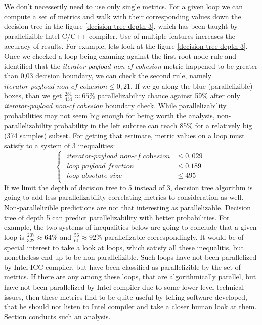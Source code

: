 \null\qquad We don't necesserily need to use only single metrics. For a given loop we can compute a set of metrics and walk with their corresponding values down the decision tree in the figure \ref{decision-tree-depth-3}, which has been taught by parallelizible Intel C/C++ compiler. Use of multiple features increases the accuracy of results. For example, lets look at the figure \ref{decision-tree-depth-3}. Once we checked a loop being examing against the first root node rule and identified that the \textit{iterator-payload non-cf cohesion} metric happened to be greater than 0,03 decision boundary, we can check the second rule, namely $\textit{iterator-payload non-cf cohesion}\leq 0,21$. If we go along the blue (parallelizible) boxes, than we get $\frac{281}{434}\approx 65\%$ parallelizability chance against 59\% after only \textit{iterator-payload non-cf cohesion} boundary check. While parallelizability probabilities may not seem big enough for being worth the analysis, non-parallelizability probability in the left subtree can reach 85\% for a relatively big (374 samples) subset. For getting that estimate, metric values on a loop must satisfy to a system of 3 inequalities:\newline
\begin{equation*}
\begin{cases}
\begin{aligned}
\textit{iterator-payload non-cf cohesion}            &\le 0,029 \\[1ex]
\textit{loop payload fraction} &\le 0.189 \\[1ex]
\textit{loop absolute size} &\leq 495
\end{aligned}
\end{cases}
\end{equation*}\newline
\null\qquad If we limit the depth of decision tree to 5 instead of 3, decision tree algorithm is going to add less parallelizability correlating metrics to consideration as well. Non-parallelizible predictions are not that interesting as parallelizable. Decision tree of depth 5 can predict parallelizability with better probabilities. For example, the two systems of inequalities below are going to conclude that a given loop is $\frac{207}{322}\approx 64\%$ and $\frac{56}{61}\approx 92\%$ parallelizable correspondingly.\newline
\null\qquad It would be of special interest to take a look at loops, which satisfy all these inequalitis, but nonetheless end up to be non-parallelizible. Such loops have not been parallelized by Intel ICC compiler, but have been classified as parallelizible by the set of metrics. If there are any among these loops, that are algorithmically parallel, but have not been parallelized by Intel compiler due to some lower-level technical issues, then these metrics find to be quite useful by telling software developed, that he should not listen to Intel compiler and take a closer human look at them. Section conducts such an analysis.
